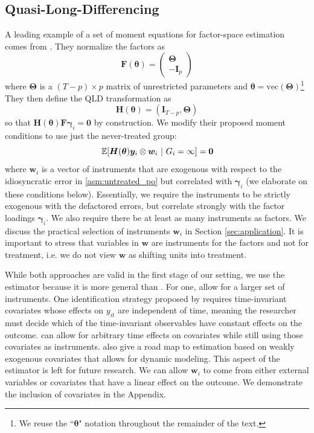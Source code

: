 \documentclass[12pt]{article}
\begin{document}
\subsection{Quasi-Long-Differencing}\label{subsection:QLD}
A leading example of a set of moment equations for factor-space estimation comes from \citet{Ahn_Lee_Schmidt_2013}. They normalize the factors as 
\begin{equation}
  \bm{F}(\bm \theta) = 
  \begin{pmatrix}
    \bm \Theta\\
    -\bm I_p
  \end{pmatrix}
\end{equation}
where $\bm \Theta$ is a $(T-p) \times p$ matrix of unrestricted parameters and $\bm \theta = \text{vec}(\bm \Theta)$\footnote{We reuse the ``$\bm \theta$" notation throughout the remainder of the text.} They then define the QLD transformation as 
\begin{equation}
  \bm H(\bm \theta) = (\bm I_{T-p}, \bm \Theta)
\end{equation}
so that $\bm H(\bm \theta) \bm{F} \bm \gamma_i = \bm 0$ by construction. We modify their proposed moment conditions to use just the never-treated group:
\begin{equation}\label{eq:factor_moments}
    \expec{\bm H(\bm \theta) \bm y_i \otimes \bm w_i}{G_i = \infty} = \bm 0
\end{equation}
where $\bm w_i$ is a vector of instruments that are exogenous with respect to the idiosyncratic error in \autoref{asm:untreated_po} but correlated with $\bm \gamma_i$ (we elaborate on these conditions below). Essentially, we require the instruments to be strictly exogenous with the defactored errors, but correlate strongly with the factor loadings $\bm \gamma_i$. We also require there be at least as many instruments as factors. 
We discuss the practical selection of instruments $\bm w_i$ in Section \ref{sec:application}. 
It is important to stress that variables in $\bm w$ are instruments for the factors and not for treatment, i.e. we do not view $\bm{w}$ as shifting units into treatment.

While both approaches are valid in the first stage of our setting, we use the \citet{Ahn_Lee_Schmidt_2013} estimator because it is more general than \citet{Callaway_Karami_2020}. For one, \citet{Ahn_Lee_Schmidt_2013} allow for a larger set of instruments. One identification strategy proposed by \citet{Callaway_Karami_2020} requires time-invariant covariates whose effects on $y_{it}$ are independent of time, meaning the researcher must decide which of the time-invariant observables have constant effects on the outcome. \citet{Ahn_Lee_Schmidt_2013} can allow for arbitrary time effects on covariates while still using those covariates as instruments. \citet{Ahn_Lee_Schmidt_2013} also give a road map to estimation based on weakly exogenous covariates that allows for dynamic modeling. This aspect of the estimator is left for future research. We can allow $\bm w_i$ to come from either external variables or covariates that have a linear effect on the outcome. We demonstrate the inclusion of covariates in the Appendix. 
\end{document}
